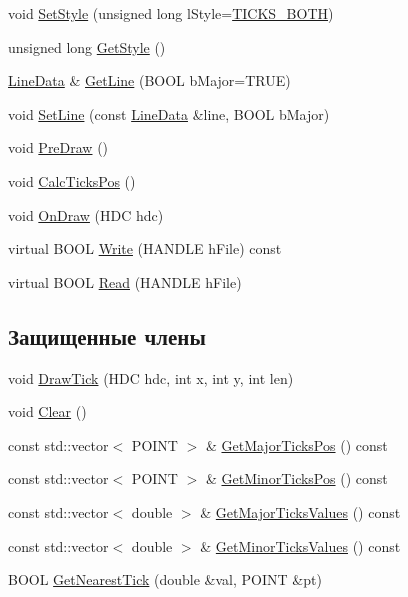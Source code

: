 \begin{DoxyCompactItemize}
\item 
void \hyperlink{class_ticks_acbb53bbd73e15aeb237e39c1035dd2e8}{Set\-Style} (unsigned long l\-Style=\hyperlink{ticks_8h_ae003d2b10c7be824e212a85e70d2b4b3}{T\-I\-C\-K\-S\-\_\-\-B\-O\-T\-H})
\item 
unsigned long \hyperlink{class_ticks_a111424e58796d2b3d923042b10b6b47a}{Get\-Style} ()
\item 
\hyperlink{class_line_data}{Line\-Data} \& \hyperlink{class_ticks_a92632374842f45c97f4eef37a027bc61}{Get\-Line} (B\-O\-O\-L b\-Major=T\-R\-U\-E)
\item 
void \hyperlink{class_ticks_a027e9507c82a5021644a0e0a3352b89b}{Set\-Line} (const \hyperlink{class_line_data}{Line\-Data} \&line, B\-O\-O\-L b\-Major)
\item 
void \hyperlink{class_ticks_aacbff2048aede4d95c9ca066603f4d5c}{Pre\-Draw} ()
\item 
void \hyperlink{class_ticks_a351eb67db476ecca6e8f0da001afa948}{Calc\-Ticks\-Pos} ()
\item 
void \hyperlink{class_ticks_a0bab06ae4f43f7f5e39f1e2e31f04045}{On\-Draw} (H\-D\-C hdc)
\item 
virtual B\-O\-O\-L \hyperlink{class_ticks_a49b690623984a9ecc3e2090dac5f0f62}{Write} (H\-A\-N\-D\-L\-E h\-File) const 
\item 
virtual B\-O\-O\-L \hyperlink{class_ticks_a6059d8bd2489336d9e77fe7c701e1d20}{Read} (H\-A\-N\-D\-L\-E h\-File)
\end{DoxyCompactItemize}
\subsection*{Защищенные члены}
\begin{DoxyCompactItemize}
\item 
void \hyperlink{class_ticks_a8e904547e1b2b57501f7a6d0dab584ac}{Draw\-Tick} (H\-D\-C hdc, int x, int y, int len)
\item 
void \hyperlink{class_ticks_a2ba3d3e17fb82993527758779ed02a49}{Clear} ()
\item 
const std\-::vector$<$ P\-O\-I\-N\-T $>$ \& \hyperlink{class_ticks_a757ebce87067b43aa91f11ae1d89bae7}{Get\-Major\-Ticks\-Pos} () const 
\item 
const std\-::vector$<$ P\-O\-I\-N\-T $>$ \& \hyperlink{class_ticks_a91076e5006090839901a73e9d0e8f50c}{Get\-Minor\-Ticks\-Pos} () const 
\item 
const std\-::vector$<$ double $>$ \& \hyperlink{class_ticks_a1bd2a0b01946d395070c38156dbc6453}{Get\-Major\-Ticks\-Values} () const 
\item 
const std\-::vector$<$ double $>$ \& \hyperlink{class_ticks_a78ee30a2532f6dd9232f68744b8fe799}{Get\-Minor\-Ticks\-Values} () const 
\item 
B\-O\-O\-L \hyperlink{class_ticks_af2f8d53ed1e949c2731b4bdc8c407549}{Get\-Nearest\-Tick} (double \&val, P\-O\-I\-N\-T \&pt)
\end{DoxyCompactItemize}
